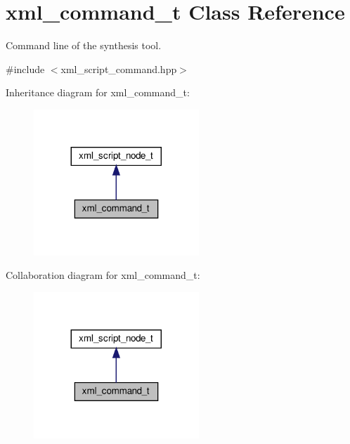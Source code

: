 \hypertarget{classxml__command__t}{}\section{xml\+\_\+command\+\_\+t Class Reference}
\label{classxml__command__t}


Command line of the synthesis tool.  




{\ttfamily \#include $<$xml\+\_\+script\+\_\+command.\+hpp$>$}



Inheritance diagram for xml\+\_\+command\+\_\+t\+:
\nopagebreak
\begin{figure}[H]
\begin{center}
\leavevmode
\includegraphics[width=176pt]{de/df9/classxml__command__t__inherit__graph}
\end{center}
\end{figure}


Collaboration diagram for xml\+\_\+command\+\_\+t\+:
\nopagebreak
\begin{figure}[H]
\begin{center}
\leavevmode
\includegraphics[width=176pt]{d7/d1f/classxml__command__t__coll__graph}
\end{center}
\end{figure}
